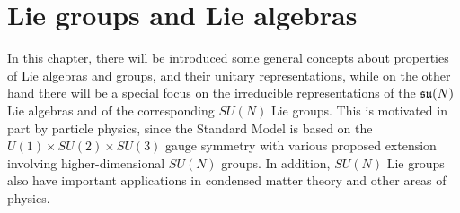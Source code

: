 \chapter{Lie groups and Lie algebras}
In this chapter, there will be introduced some general concepts about properties of Lie algebras and groups, and their unitary representations, while on the other hand there will be a special focus on the irreducible representations of the $\mathfrak{su}(N)$ Lie algebras and of the corresponding $SU(N)$ Lie groups. This is motivated in part by particle physics, since the Standard Model is based on the $U(1) \times SU(2) \times SU(3)$ gauge symmetry with various proposed extension involving higher-dimensional $SU(N)$ groups. In addition, $SU(N)$ Lie groups also have important applications in condensed matter theory and other areas of physics. 

